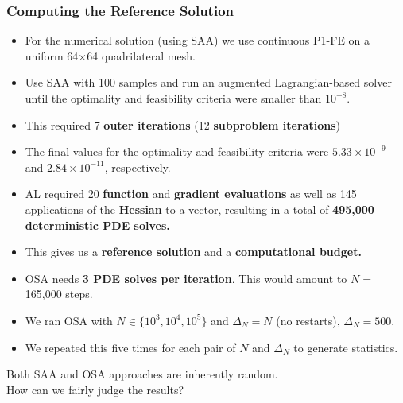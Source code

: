 \documentclass[aspectratio=169,xcolor=dvipsnames,11pt]{beamer}
\begin{document}
\begin{footnotesize}
\begin{frame}
\end{frame}

\begin{frame}\frametitle{Computing the Reference Solution}
\vspace{-2ex}
\begin{block}{}
\begin{itemize}
\item For the numerical solution (using SAA) we use continuous P1-FE on a uniform 64×64 quadrilateral mesh.
\item Use SAA with 100 samples and run an augmented Lagrangian-based solver until the optimality and feasibility criteria were smaller than $10^{-8}$.
\item This required 7 \textbf{outer iterations} (12 \textbf{subproblem iterations})
\item The final values for the optimality and feasibility criteria were $5.33 \times 10^{-9}$ and $2.84\times10^{-11}$, respectively. 
\item AL required 20 \textbf{function} and \textbf{gradient evaluations} as well as 145 applications of the \textbf{Hessian} to a vector, resulting in a total of \textbf{495,000 deterministic PDE solves.}
\end{itemize}
\end{block}\pause
\vspace{-2ex}
\begin{block}{}
\begin{itemize}
\item This gives us a \textbf{reference solution} and a \textbf{computational budget.}
\item OSA needs \textbf{3 PDE solves per iteration}. This would amount to $N =$ 165,000 steps.
\item We ran OSA with $N \in \{10^{3}, 10^{4}, 10^{5} \}$ and $\Delta_N = N$ (no restarts), $\Delta_N = 500$.
\item We repeated this five times for each pair of $N$ and $\Delta_N$ to generate statistics.
\end{itemize}
\end{block}
\end{frame}

\begin{frame}[noframenumbering]\thispagestyle{empty}
\vspace*{\fill}
\begin{center}
\Large 
Both SAA and OSA approaches are inherently random.\\ How can we fairly judge the results?
\end{center}
\vspace*{\fill}
\end{frame}


\end{footnotesize}
\end{document}
